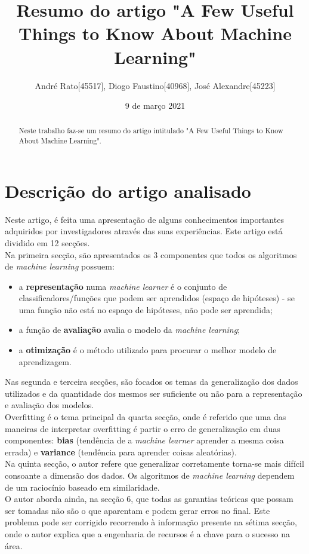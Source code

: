 \documentclass{article}
\title{Resumo do artigo "A Few Useful Things to Know About Machine Learning"}
\author{André Rato[45517], Diogo Faustino[40968], José Alexandre[45223]}
\date{9 de março 2021}
\begin{document}
\maketitle
\begin{abstract}
Neste trabalho faz-se um resumo do artigo intitulado "A Few Useful Things to Know About Machine Learning"\cite{ref1}.

\end{abstract}
\section{Descrição do artigo analisado}
Neste artigo, é feita uma apresentação de alguns conhecimentos importantes adquiridos por investigadores através das suas experiências. Este artigo está dividido em 12 secções.\\
Na primeira secção, são apresentados os 3 componentes que todos os algoritmos de \textsl{machine learning} possuem:
\begin{itemize}
    \item a \textbf{representação} numa \textsl{machine learner} é o conjunto de classificadores/funções que podem ser aprendidos (espaço de hipóteses) - se uma função não está no espaço de hipóteses, não pode ser aprendida;
    \item a função de \textbf{avaliação} avalia o modelo da \textsl{machine learning};
    \item a \textbf{otimização} é o método utilizado para procurar o melhor modelo de aprendizagem.
\end{itemize}
Nas segunda e terceira secções, são focados os temas da generalização dos dados utilizados e da quantidade dos mesmos ser suficiente ou não para a representação e avaliação dos modelos.\\
Overfitting é o tema principal da quarta secção, onde é referido que uma das maneiras de interpretar overfitting é partir o erro de generalização em duas componentes: \textbf{bias} (tendência de a \textsl{machine learner} aprender a mesma coisa errada) e \textbf{variance} (tendência para aprender coisas aleatórias).\\
Na quinta secção, o autor refere que generalizar corretamente torna-se mais difícil consoante a dimensão dos dados. Os algoritmos de \textsl{machine learning} dependem de um raciocínio baseado em similaridade.\\
O autor aborda ainda, na secção 6, que todas as garantias teóricas que possam ser tomadas não são o que aparentam e podem gerar erros no final. Este problema pode ser corrigido recorrendo à informação presente na sétima secção, onde o autor explica que a engenharia de recursos é a chave para o sucesso na área.\\
\end{document}

